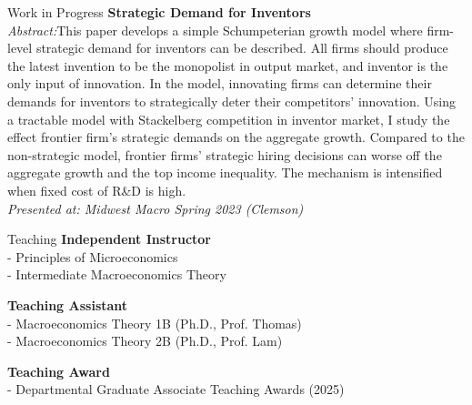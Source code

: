 \documentclass{cv} %
\begin{document}
\begin{rSection}{Work in Progress}
\medskip
{\bf Strategic Demand for Inventors} \\
	 \begin{adjustbox}{minipage=0.95\textwidth, right}
		\vspace{0.3em} {\emph{Abstract:}This paper develops a simple Schumpeterian growth model where firm-level strategic demand for inventors can be described.  All firms should produce the latest invention to be the monopolist in output market, and inventor is the only input of innovation.  In the model, innovating firms can determine their demands for inventors to strategically deter their competitors' innovation.  Using a tractable model with Stackelberg competition in inventor market,  I study the effect frontier firm's strategic demands on the aggregate growth.  Compared to the non-strategic model,  frontier firms' strategic hiring decisions can worse off the aggregate growth and the top income inequality.  The mechanism is intensified when fixed cost of R\&D is high.} \\
		\emph{Presented at: Midwest Macro Spring 2023 (Clemson)}
	\end{adjustbox}\\

\end{rSection}
\bigskip

\begin{rSection}{Teaching}
	{\bf Independent Instructor} \\
	\begin{adjustbox}{minipage=0.95\textwidth, right}
		\vspace{0.3em} 
		- Principles of Microeconomics \\
		- Intermediate Macroeconomics Theory
	\end{adjustbox}

	\medskip
	{\bf Teaching Assistant} \\
	\begin{adjustbox}{minipage=0.95\textwidth, right}
		\vspace{0.3em} 
		- Macroeconomics Theory 1B (Ph.D., Prof. Thomas) \\
		- Macroeconomics Theory 2B (Ph.D., Prof. Lam)
	\end{adjustbox}

	\medskip
	{\bf Teaching Award} \\
	\begin{adjustbox}{minipage=0.95\textwidth, right}
		\vspace{0.3em} 
		- Departmental Graduate Associate Teaching Awards (2025)
	\end{adjustbox}
\end{rSection}
\end{document}
